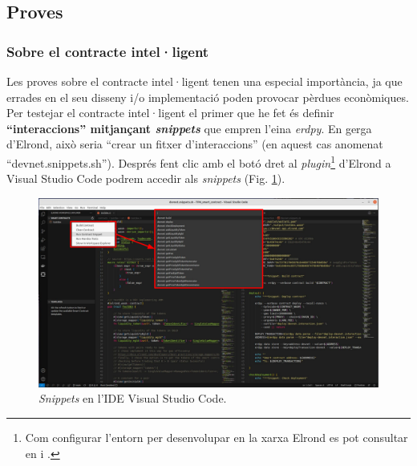 \documentclass[11pt,a4paper]{article}
\begin{document}
\subsection{Proves}
\subsubsection{Sobre el contracte intel·ligent}\label{subsub:sc}
Les proves sobre el contracte intel·ligent tenen una especial importància, ja que errades en el seu disseny i/o implementació poden provocar pèrdues econòmiques. Per testejar el contracte intel·ligent el primer que he fet és definir \textbf{``interaccions'' mitjançant \textit{snippets}} que empren l'eina \textit{erdpy}. En gerga d'Elrond, això seria ``crear un fitxer d'interaccions'' (en aquest cas anomenat ``devnet.snippets.sh''). Després fent clic amb el botó dret al \textit{plugin}\footnote{Com configurar l'entorn per desenvolupar en la xarxa Elrond es pot consultar en \cite{elrondnet2020} i \cite{ton2021}.} d'Elrond a Visual Studio Code podrem accedir als \textit{snippets} (Fig. \ref{fig:test-snippets}).

\begin{figure}[h]
\includegraphics[width=1\textwidth]{test-snippets.png}
\centering
\caption{\textit{Snippets} en l'IDE Visual Studio Code.}\label{fig:test-snippets}
\end{figure} 
\end{document}
